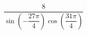 \begin{ex}[type=type=expression]
	\begin{condition}
		\( \dfrac{8}{\sin\left( -\dfrac{27\pi}{4} \right)\cos\left( \dfrac{31\pi}{4} \right)} \)
	\end{condition}
\end{ex}